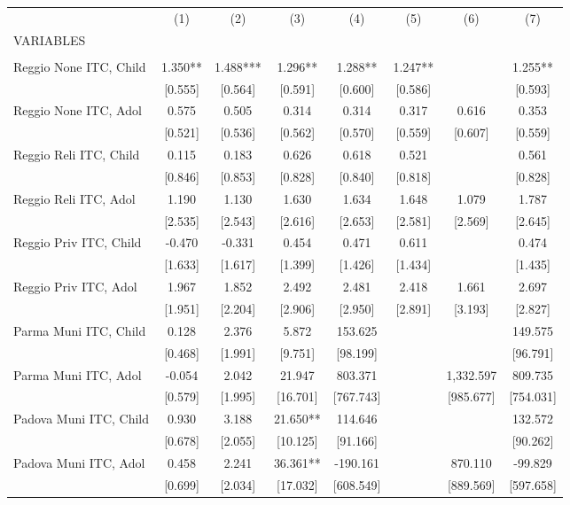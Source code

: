\begin{tabular}{lccccccc} \hline
 & (1) & (2) & (3) & (4) & (5) & (6) & (7) \\
VARIABLES &  &  &  &  &  &  &  \\ \hline
 &  &  &  &  &  &  &  \\
Reggio None ITC, Child & 1.350** & 1.488*** & 1.296** & 1.288** & 1.247** &  & 1.255** \\
 & [0.555] & [0.564] & [0.591] & [0.600] & [0.586] &  & [0.593] \\
Reggio None ITC, Adol & 0.575 & 0.505 & 0.314 & 0.314 & 0.317 & 0.616 & 0.353 \\
 & [0.521] & [0.536] & [0.562] & [0.570] & [0.559] & [0.607] & [0.559] \\
Reggio Reli ITC, Child & 0.115 & 0.183 & 0.626 & 0.618 & 0.521 &  & 0.561 \\
 & [0.846] & [0.853] & [0.828] & [0.840] & [0.818] &  & [0.828] \\
Reggio Reli ITC, Adol & 1.190 & 1.130 & 1.630 & 1.634 & 1.648 & 1.079 & 1.787 \\
 & [2.535] & [2.543] & [2.616] & [2.653] & [2.581] & [2.569] & [2.645] \\
Reggio Priv ITC, Child & -0.470 & -0.331 & 0.454 & 0.471 & 0.611 &  & 0.474 \\
 & [1.633] & [1.617] & [1.399] & [1.426] & [1.434] &  & [1.435] \\
Reggio Priv ITC, Adol & 1.967 & 1.852 & 2.492 & 2.481 & 2.418 & 1.661 & 2.697 \\
 & [1.951] & [2.204] & [2.906] & [2.950] & [2.891] & [3.193] & [2.827] \\
Parma Muni ITC, Child & 0.128 & 2.376 & 5.872 & 153.625 &  &  & 149.575 \\
 & [0.468] & [1.991] & [9.751] & [98.199] &  &  & [96.791] \\
Parma Muni ITC, Adol & -0.054 & 2.042 & 21.947 & 803.371 &  & 1,332.597 & 809.735 \\
 & [0.579] & [1.995] & [16.701] & [767.743] &  & [985.677] & [754.031] \\
Padova Muni ITC, Child & 0.930 & 3.188 & 21.650** & 114.646 &  &  & 132.572 \\
 & [0.678] & [2.055] & [10.125] & [91.166] &  &  & [90.262] \\
Padova Muni ITC, Adol & 0.458 & 2.241 & 36.361** & -190.161 &  & 870.110 & -99.829 \\
 & [0.699] & [2.034] & [17.032] & [608.549] &  & [889.569] & [597.658] \\

\end{tabular}
